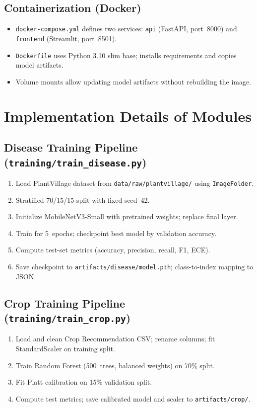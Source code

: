 \documentclass[12pt,a4paper]{report}
\begin{document}
\subsection{Containerization (Docker)}
\begin{itemize}[leftmargin=*]
  \item \texttt{docker-compose.yml} defines two services: \texttt{api} (FastAPI, port~8000) and \texttt{frontend} (Streamlit, port~8501).
  \item \texttt{Dockerfile} uses Python 3.10 slim base; installs requirements and copies model artifacts.
  \item Volume mounts allow updating model artifacts without rebuilding the image.
\end{itemize}

\section{Implementation Details of Modules}

\subsection{Disease Training Pipeline (\texttt{training/train\_disease.py})}
\begin{enumerate}[leftmargin=*]
  \item Load PlantVillage dataset from \texttt{data/raw/plantvillage/} using \texttt{ImageFolder}.
  \item Stratified 70/15/15 split with fixed seed~42.
  \item Initialize MobileNetV3-Small with pretrained weights; replace final layer.
  \item Train for 5~epochs; checkpoint best model by validation accuracy.
  \item Compute test-set metrics (accuracy, precision, recall, F1, ECE).
  \item Save checkpoint to \texttt{artifacts/disease/model.pth}; class-to-index mapping to JSON.
\end{enumerate}

\subsection{Crop Training Pipeline (\texttt{training/train\_crop.py})}
\begin{enumerate}[leftmargin=*]
  \item Load and clean Crop Recommendation CSV; rename columns; fit StandardScaler on training split.
  \item Train Random Forest (500~trees, balanced weights) on 70\% split.
  \item Fit Platt calibration on 15\% validation split.
  \item Compute test metrics; save calibrated model and scaler to \texttt{artifacts/crop/}.
\end{enumerate}
\end{document}
